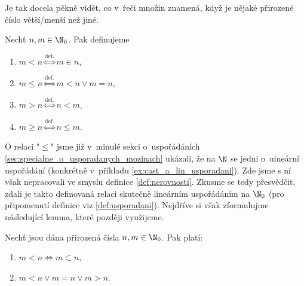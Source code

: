Je tak docela pěkně vidět, co v~řeči množin znamená, když je nějaké přirozené číslo větší/menší než jiné.
\begin{definition}\label{def:nerovnosti}
    Nechť $n,m\in\N_0$. Pak definujeme
    \begin{enumerate}[label=(\roman*)]
        \item $m<n\stackrel{\text{def.}}{\iff}m\in n$,
        \item $m\leq n\stackrel{\text{def.}}{\iff}m<n\lor m=n$,
        \item $m>n\stackrel{\text{def.}}{\iff}n<m$,
        \item $m\geq n\stackrel{\text{def.}}{\iff}n\leq m$.
    \end{enumerate}
\end{definition}
O relaci "$\leq$" jsme již v~minulé sekci o~uspořádáních \ref{sec:specialne_o_usporadanych_mozinach} ukázali, že na $\N$ se jedni o~uineární uspořádání (konkrétně v~příkladu \ref{ex:cast_a_lin_usporadani}). Zde jsme s ní však nepracovali ve smyslu definice \ref{def:nerovnosti}. Zkusme se tedy přesvědčit, zdali je takto definovaná relaci skutečně lineárním uspořádáním na $\N_0$ (pro připomenutí definice viz \ref{def:usporadani}). Nejdříve si však zformulujme následující lemma, které později využijeme.
\begin{lemma}\label{lem:vlastnosti_prirozenych_cisel_2}
    Nechť jsou dána přirozená čísla $n,m\in\N_0$. Pak platí:
    \begin{enumerate}[label=(\roman*)]
        \item\label{item:vlastnost_2_1} $m<n\iff m\subset n$,
        \item\label{item:vlastnost_2_2} $m<n \lor m=n \lor m>n$.
    \end{enumerate}
\end{lemma}
